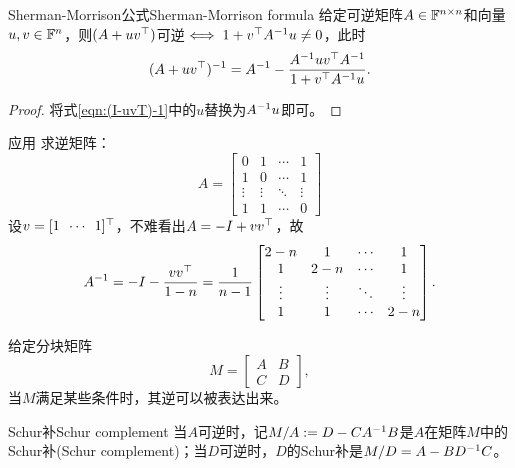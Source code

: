 \begin{theorem}
	{Sherman-Morrison公式}{Sherman-Morrison formula}
	给定可逆矩阵$A\in\mathbb F^{n\times n}$和向量$u,v\in\mathbb F^n$，则$(A+uv^\top)$可逆$\iff 1+v^\top A^{-1} u\neq 0$，此时
	\begin{equation}
		(A+uv^\top)^{-1}=A^{-1}-\frac{A^{-1} uv^\top A^{-1}}{1+v^\top A^{-1} u}.
	\end{equation}
\end{theorem}
\begin{proof}
	将式\eqref{eqn:(I-uvT)-1}中的$u$替换为$A^{-1} u$即可。
\end{proof}

\begin{example}
	{应用}{}
	求逆矩阵：
	\[
		A=\begin{bmatrix}
			0&1&\cdots&1\\
			1&0&\cdots&1\\
			\vdots&\vdots&\ddots&\vdots\\
			1&1&\cdots&0
		\end{bmatrix}
	\]
	设$v=[1\enspace\cdots\enspace 1]^\top$，不难看出$A=-I+vv^\top$，故
	\[
		A^{-1}=-I-\frac{vv^\top}{1-n}=\frac1{n-1}\begin{bmatrix}
			2-n&1&\cdots&1\\
			1&2-n&\cdots&1\\
			\vdots&\vdots&\ddots&\vdots\\
			1&1&\cdots&2-n
		\end{bmatrix}.
	\]
\end{example}


给定分块矩阵
\[
	M=\begin{bmatrix}
		A&B\\C&D
	\end{bmatrix},
\]
当$M$满足某些条件时，其逆可以被表达出来。

\begin{definition}
	{Schur补}{Schur complement}
	当$A$可逆时，记$M/A:=D-CA^{-1} B$是$A$在矩阵$M$中的Schur补(Schur complement)；当$D$可逆时，$D$的Schur补是$M/D=A-BD^{-1} C$。
\end{definition}

